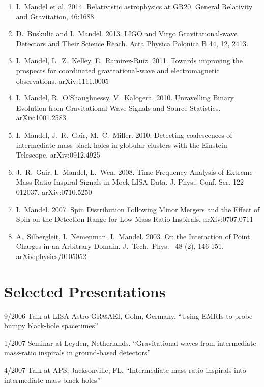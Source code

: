 \documentclass[margin,line]{res}
\begin{document}
\begin{resume}
\begin{enumerate}
\item I.~Mandel et al.  2014.  Relativistic astrophysics at GR20.  General Relativity and Gravitation, 46:1688.

\item D.~Buskulic and I.~Mandel.  2013.  LIGO and Virgo Gravitational-wave Detectors and Their Science Reach.  Acta Physica Polonica B 44, 12, 2413.

\item I.~Mandel, L.~Z.~Kelley, E.~Ramirez-Ruiz. 2011. Towards improving the prospects for coordinated gravitational-wave and electromagnetic observations. arXiv:1111.0005
 
\item I.~Mandel, R.~O'Shaughnessy, V.~Kalogera.  2010.  Unravelling Binary Evolution from Gravitational-Wave Signals and Source Statistics. arXiv:1001.2583 

\item I.~Mandel, J.~R.~Gair, M.~C.~Miller.  2010.  Detecting coalescences of intermediate-mass black holes in globular clusters with the Einstein Telescope.  arXiv:0912.4925  

\item J.~R.~Gair, I.~Mandel, L.~Wen. 2008.  Time-Frequency Analysis of 
Extreme-Mass-Ratio Inspiral Signals in Mock LISA Data.  
J. Phys.: Conf. Ser. 122 012037.  arXiv:0710.5250

\item I.~Mandel. 2007. Spin Distribution Following Minor Mergers and the 
Effect of Spin on the Detection Range for Low-Mass-Ratio Inspirals. 
arXiv:0707.0711

\item A.~Silbergleit, I.~Nemenman, I.~Mandel. 2003. On the Interaction of 
Point Charges in an Arbitrary Domain.  J.~Tech.~Phys.~ 48 (2), 146-151.  
arXiv:physics/0105052

\end{enumerate}

\newpage
\section{\sc Selected Presentations}
9/2006 	 Talk  at LISA Astro-GR@AEI, Golm, Germany. 	 ``Using EMRIs to probe bumpy black-hole spacetimes''

1/2007 	Seminar at Leyden, Netherlands. 	``Gravitational waves from intermediate-mass-ratio inspirals in ground-based detectors''

4/2007 	Talk 	at APS, Jacksonville, FL. 	``Intermediate-mass-ratio inspirals into intermediate-mass black holes''


\end{resume}
\end{document}

